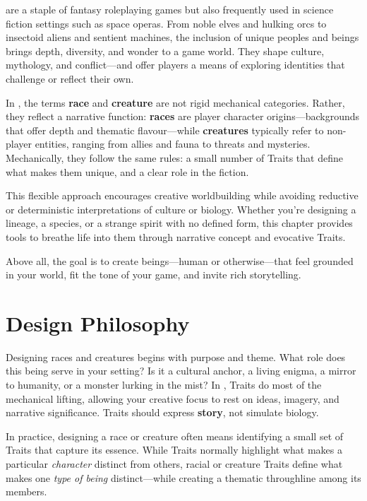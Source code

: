 
 are a staple of fantasy roleplaying games but also frequently used in science fiction settings such as space operas. From noble elves and hulking orcs to insectoid aliens and sentient machines, the inclusion of unique peoples and beings brings depth, diversity, and wonder to a game world. They shape culture, mythology, and conflict—and offer players a means of exploring identities that challenge or reflect their own.

In \wyrd, the terms \textbf{race} and \textbf{creature} are not rigid mechanical categories. Rather, they reflect a narrative function: \textbf{races} are player character origins—backgrounds that offer depth and thematic flavour—while \textbf{creatures} typically refer to non-player entities, ranging from allies and fauna to threats and mysteries. Mechanically, they follow the same rules: a small number of Traits that define what makes them unique, and a clear role in the fiction.

This flexible approach encourages creative worldbuilding while avoiding reductive or deterministic interpretations of culture or biology. Whether you're designing a lineage, a species, or a strange spirit with no defined form, this chapter provides tools to breathe life into them through narrative concept and evocative Traits.

Above all, the goal is to create beings—human or otherwise—that feel grounded in your world, fit the tone of your game, and invite rich storytelling.

\section{Design Philosophy}

Designing races and creatures begins with purpose and theme. What role does this being serve in your setting? Is it a cultural anchor, a living enigma, a mirror to humanity, or a monster lurking in the mist? In \wyrd, Traits do most of the mechanical lifting, allowing your creative focus to rest on ideas, imagery, and narrative significance. Traits should express \textbf{story}, not simulate biology.

In practice, designing a race or creature often means identifying a small set of Traits that capture its essence. While Traits normally highlight what makes a particular \emph{character} distinct from others, racial or creature Traits define what makes one \emph{type of being} distinct—while creating a thematic throughline among its members.

